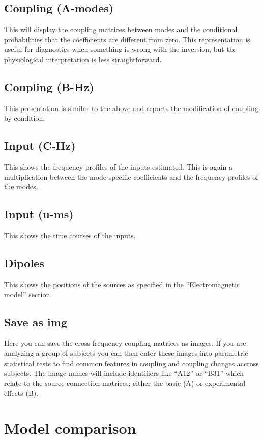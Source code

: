 \subsection{Coupling (A-modes)}
This will display the coupling matrices between modes and the conditional probabilities that the coefficients are different from zero. This representation is useful for diagnostics when something is wrong with the inversion, but the physiological interpretation is less straightforward.

\subsection{Coupling (B-Hz)}
This presentation is similar to the above and reports the modification of coupling by condition. 

\subsection{Input (C-Hz)}
This shows the frequency profiles of the inputs estimated. This is again a multiplication between the mode-specific coefficients and the frequency profiles of the modes. 

\subsection{Input (u-ms)}
This shows the time courses of the inputs.

\subsection{Dipoles}
This shows the positions of the sources as specified in the ``Electromagnetic model'' section.

\subsection{Save as img}
Here you can save the cross-frequency coupling matrices as images. If you are analyzing a group of subjects you can then enter these images into parametric statistical tests to find common features in coupling and coupling changes accross subjects. The image names will include identifiers like ``A12'' or ``B31'' which relate to the source connection matrices; either the basic (A) or experimental effects (B).

\section{Model comparison}

